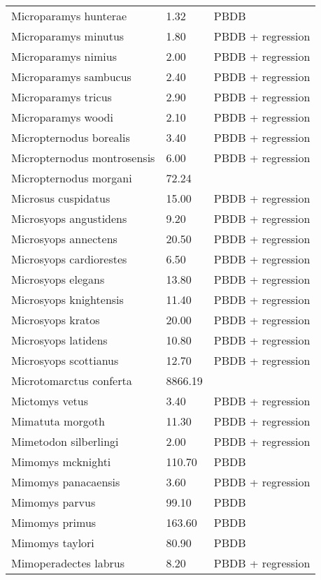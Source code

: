 \documentclass{article}
\begin{document}
\begin{center}
\begin{longtable}{p{} p{} p{}}
    Microparamys hunterae & 1.32 & PBDB \\ 
    Microparamys minutus & 1.80 & PBDB + regression \\ 
    Microparamys nimius & 2.00 & PBDB + regression \\ 
    Microparamys sambucus & 2.40 & PBDB + regression \\ 
    Microparamys tricus & 2.90 & PBDB + regression \\ 
    Microparamys woodi & 2.10 & PBDB + regression \\ 
    Micropternodus borealis & 3.40 & PBDB + regression \\ 
    Micropternodus montrosensis & 6.00 & PBDB + regression \\ 
    Micropternodus morgani & 72.24 & \cite{Tomiya2013} \\ 
    Microsus cuspidatus & 15.00 & PBDB + regression \\ 
    Microsyops angustidens & 9.20 & PBDB + regression \\ 
    Microsyops annectens & 20.50 & PBDB + regression \\ 
    Microsyops cardiorestes & 6.50 & PBDB + regression \\ 
    Microsyops elegans & 13.80 & PBDB + regression \\ 
    Microsyops knightensis & 11.40 & PBDB + regression \\ 
    Microsyops kratos & 20.00 & PBDB + regression \\ 
    Microsyops latidens & 10.80 & PBDB + regression \\ 
    Microsyops scottianus & 12.70 & PBDB + regression \\ 
    Microtomarctus conferta & 8866.19 & \cite{Tomiya2013} \\ 
    Mictomys vetus & 3.40 & PBDB + regression \\ 
    Mimatuta morgoth & 11.30 & PBDB + regression \\ 
    Mimetodon silberlingi & 2.00 & PBDB + regression \\ 
    Mimomys mcknighti & 110.70 & PBDB \\ 
    Mimomys panacaensis & 3.60 & PBDB + regression \\ 
    Mimomys parvus & 99.10 & PBDB \\ 
    Mimomys primus & 163.60 & PBDB \\ 
    Mimomys taylori & 80.90 & PBDB \\ 
    Mimoperadectes labrus & 8.20 & PBDB + regression \\ 

\end{longtable}
\end{center}
\end{document}
